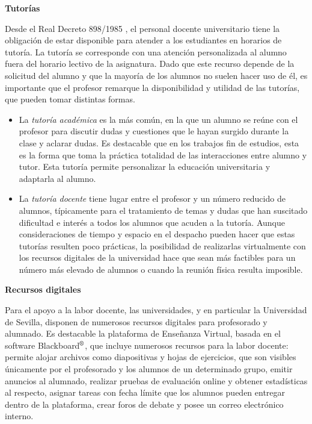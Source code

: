 \documentclass[a4paper,12pt,twoside]{article}
\begin{document}
\textbf{Tutorías} 

Desde el Real Decreto 898/1985 \cite{tutorias}, el personal docente universitario tiene la obligación de estar disponible para atender a los estudiantes en horarios de tutoría. La tutoría se corresponde con una atención personalizada al alumno fuera del horario lectivo de la asignatura. Dado que este recurso depende de la solicitud del alumno y que la mayoría de los alumnos no suelen hacer uso de él, es importante que el profesor remarque la disponibilidad y utilidad de las tutorías, que pueden tomar distintas formas. 

\begin{itemize}
\item La \textit{tutoría académica} es la más común, en la que un alumno se reúne con el profesor para discutir dudas y cuestiones que le hayan surgido durante la clase y aclarar dudas. Es destacable que en los trabajos fin de estudios, esta es la forma que toma la práctica totalidad de las interacciones entre alumno y tutor. Esta tutoría permite personalizar la educación universitaria y adaptarla al alumno.

\item La \textit{tutoría docente} tiene lugar entre el profesor y un número reducido de alumnos, típicamente para el tratamiento de temas y dudas que han suscitado dificultad e interés a todos los alumnos que acuden a la tutoría. Aunque consideraciones de tiempo y espacio en el despacho pueden hacer que estas tutorías resulten poco prácticas, la posibilidad de realizarlas virtualmente con los recursos digitales de la universidad hace que sean más factibles para un número más elevado de alumnos o cuando la reunión física resulta imposible.
\end{itemize}

\textbf{Recursos digitales}

Para el apoyo a la labor docente, las universidades, y en particular la Universidad de Sevilla, disponen de numerosos recursos digitales para profesorado y alumnado. Es destacable la plataforma de Enseñanza Virtual, basada en el software Blackboard$^\text{\textregistered}$, que incluye numerosos recursos para la labor docente: permite alojar archivos como diapositivas y hojas de ejercicios, que son visibles únicamente por el profesorado y los alumnos de un determinado grupo, emitir anuncios al alumnado, realizar pruebas de evaluación online y obtener estadísticas al respecto, asignar tareas con fecha límite que los alumnos pueden entregar dentro de la plataforma, crear foros de debate y posee un correo electrónico interno.
\end{document}
